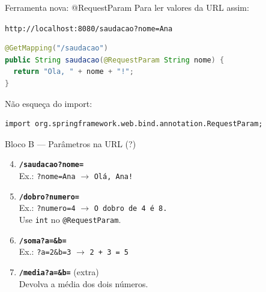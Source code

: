 \documentclass[aspectratio=169,11pt]{beamer}
\begin{document}
\begin{frame}[fragile]{Ferramenta nova: @RequestParam}
  Para ler valores da URL assim:

  \begin{center}
    \texttt{http://localhost:8080/saudacao?nome=Ana}
  \end{center}

\begin{lstlisting}[language=Java,basicstyle=\ttfamily\footnotesize]
@GetMapping("/saudacao")
public String saudacao(@RequestParam String nome) {
  return "Ola, " + nome + "!";
}
\end{lstlisting}

  \vspace{0.3em}
  Não esqueça do import:

\begin{lstlisting}[basicstyle=\ttfamily\footnotesize]
import org.springframework.web.bind.annotation.RequestParam;
\end{lstlisting}
\end{frame}

\begin{frame}{Bloco B --- Parâmetros na URL (?)}
  \begin{enumerate}
    \setcounter{enumi}{3}
    \item \textbf{\texttt{/saudacao?nome=}}\\
          Ex.: \texttt{?nome=Ana} $\rightarrow$ \texttt{Olá, Ana!}
    \item \textbf{\texttt{/dobro?numero=}}\\
          Ex.: \texttt{?numero=4} $\rightarrow$ \texttt{O dobro de 4 é 8.}\\
          Use \texttt{int} no \texttt{@RequestParam}.
    \item \textbf{\texttt{/soma?a=\&b=}}\\
          Ex.: \texttt{?a=2\&b=3} $\rightarrow$ \texttt{2 + 3 = 5}
    \item \textbf{\texttt{/media?a=\&b=}} (extra)\\
          Devolva a média dos dois números.
  \end{enumerate}
\end{frame}
\end{document}
